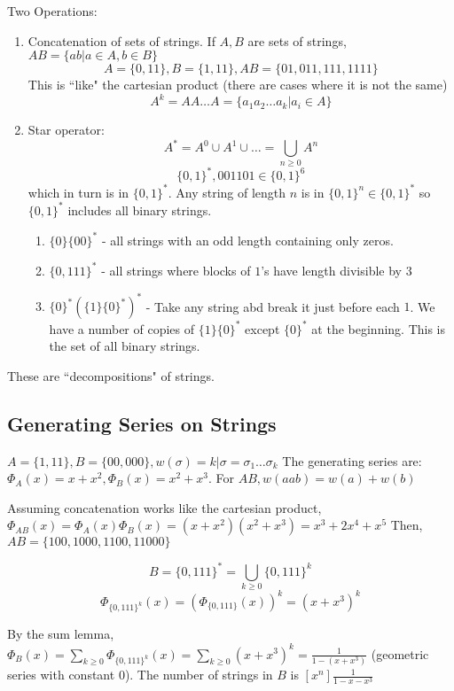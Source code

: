 \documentclass{article}
\begin{document}
Two Operations:
\begin{enumerate}
	\item Concatenation of sets of strings. If $A,B$ are sets of strings, $AB = \{ab | a \in A, b \in B \}$
		\example
		$$A = \{0,11\}, B=\{1,11\}, AB = \{01,011,111,1111 \}$$
		This is ``like" the cartesian product (there are cases where it is not the same)
		$$A^k = AA \dots A = \{a_1a_2 \dots a_k | a_i \in A \}$$ %

	\item Star operator: $$A^* = A^0 \cup A^1 \cup \dots = \bigcup_{n \ge 0}A^n$$
		\example
		$$\{0,1\}^*, 001101 \in \{0,1\}^6$$
		which in turn is in $\{0,1\}^*$. Any string of length $n$ is in $\{0,1\}^n \in \{0,1\}^*$ so $\{0,1\}^*$ includes all binary strings.

		\example
		\begin{enumerate}
			\item $\{0\}\{00\}^*$ - all strings with an odd length containing only zeros.
			\item $\{0,111\}^*$ - all strings where blocks of $1$'s have length divisible by $3$
			\item $\{0\}^*(\{1\}\{0\}^*)^*$ - Take any string abd break it just before each $1$. We have a number of copies of $\{1\}\{0\}^*$ except $\{0\}^*$ at the beginning. This is the set of all binary strings.
		\end{enumerate}
		
\end{enumerate}
These are ``decompositions" of strings.

\subsection{Generating Series on Strings}
\example 
$A =\{ 1,11\} , B=\{ 00,000\} , w(\sigma ) = k | \sigma = \sigma_{1} \dots \sigma_{k}$ The generating series are: $\Phi_A(x) = x+x^2, \Phi_B(x) = x^2+x^3$. For $AB, w(aab) = w(a) + w(b)$

Assuming concatenation works like the cartesian product, $\Phi_{AB}(x) = \Phi_A(x) \Phi_B(x) = (x+x^2)(x^2+x^3) = x^3 + 2x^4+x^5$ Then, $AB = \{100,1000,1100,11000\}$

\example
$$B = \{0,111\}^* = \bigcup_{k \ge 0}\{0,111\}^k$$
$$\Phi_{\{ 0,111\}^k }(x) = \left( \Phi_{\{0,111\}}(x) \right)^k = (x+x^3)^k$$ 

By the sum lemma, $\Phi_B(x) = \sum_{k \ge 0}\Phi_{\{0,111\}^k}(x) = \sum_{k \ge 0}(x+x^3)^k = \frac{1}{1-(x+x^3)}$ (geometric series with constant $0$). The number of strings in $B$ is $[x^n]\frac{1}{1-x-x^3}$
\end{document}
